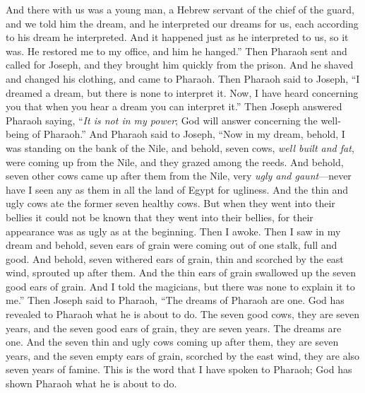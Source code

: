 \begin{biblechapter}
\verse And there with us was a young man, a Hebrew servant of the chief of the guard, and we told him the dream, and he interpreted our dreams for us, each according to his dream he interpreted.
\verse And it happened just as he interpreted to us, so it was. He restored me to my office, and him he hanged.”
\verse Then Pharaoh sent and called for Joseph, and they brought him quickly from the prison. And he shaved and changed his clothing, and came to Pharaoh.
\verse Then Pharaoh said to Joseph, “I dreamed a dream, but there is none to interpret it. Now, I have heard concerning you that when you hear a dream you can interpret it.”
\verse Then Joseph answered Pharaoh saying, “\textit{It is not in my power}; God will answer concerning the well-being of Pharaoh.”
\verse And Pharaoh said to Joseph, “Now in my dream, behold, I was standing on the bank of the Nile,
\verse and behold, seven cows, \textit{well built and fat}, were coming up from the Nile, and they grazed among the reeds.
\verse And behold, seven other cows came up after them from the Nile, very \textit{ugly and gaunt}—never have I seen any as them in all the land of Egypt for ugliness.
\verse And the thin and ugly cows ate the former seven healthy cows.
\verse But when they went into their bellies it could not be known that they went into their bellies, for their appearance was as ugly as at the beginning. Then I awoke.
\verse Then I saw in my dream and behold, seven ears of grain were coming out of one stalk, full and good.
\verse And behold, seven withered ears of grain, thin and scorched by the east wind, sprouted up after them.
\verse And the thin ears of grain swallowed up the seven good ears of grain. And I told the magicians, but there was none to explain it to me.”
\verse Then Joseph said to Pharaoh, “The dreams of Pharaoh are one. God has revealed to Pharaoh what he is about to do.
\verse The seven good cows, they are seven years, and the seven good ears of grain, they are seven years. The dreams are one.
\verse And the seven thin and ugly cows coming up after them, they are seven years, and the seven empty ears of grain, scorched by the east wind, they are also seven years of famine.
\verse This is the word that I have spoken to Pharaoh; God has shown Pharaoh what he is about to do.

\end{biblechapter}
